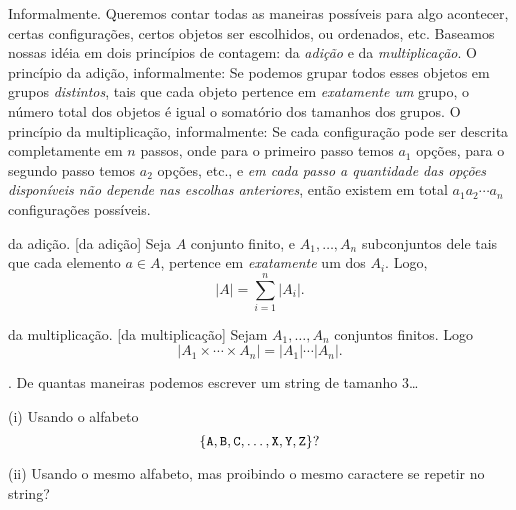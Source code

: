 \note Informalmente.
Queremos contar todas as maneiras possíveis para algo acontecer,
certas configurações, certos objetos ser escolhidos, ou ordenados, etc.
Baseamos nossas idéia em dois princípios de contagem:
da \emph{adição} e da \emph{multiplicação}.
\endgraf
{O princípio da adição, informalmente:}
Se podemos grupar todos esses objetos em grupos \emph{distintos},
tais que cada objeto pertence em \emph{exatamente um} grupo,
o número total dos objetos é igual o somatório dos tamanhos dos grupos.
\endgraf
{O princípio da multiplicação, informalmente:}
Se cada configuração pode ser descrita completamente em $n$ passos,
onde para o primeiro passo temos $a_1$ opções,
para o segundo passo temos $a_2$ opções, etc., e
\emph{em cada passo a quantidade das opções disponíveis
não depende nas escolhas anteriores},
então existem em total $a_1a_2\dotsb a_n$ configurações possíveis.

\principle da adição.
\label{principle_of_addition}%
[da adição]
Seja $A$ conjunto finito, e $A_1,\dotsc,A_n$ subconjuntos dele tais que cada elemento $a\in A$, pertence em \emph{exatamente} um dos $A_i$.
Logo,
$$
|A| = \sum_{i=1}^n |A_i|.
$$

\principle da multiplicação.
\label{principle_of_multiplication}%
[da multiplicação]
Sejam $A_1,\dotsc,A_n$ conjuntos finitos.
Logo
$$
|A_1\times\dotsb\times A_n| = |A_1|\dotsb|A_n|.
$$

\example.
De quantas maneiras podemos escrever um string de tamanho $3$\dots
\item{(i)} Usando o alfabeto
$$
\left\{\text{\tt A}, \text{\tt B}, \text{\tt C}, \dotsc, \text{\tt X}, \text{\tt Y}, \text{\tt Z}\right\}?
$$
\item{(ii)} Usando o mesmo alfabeto, mas proibindo o mesmo caractere se repetir no string?

